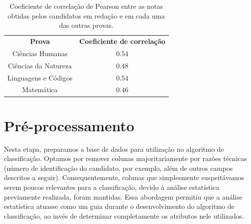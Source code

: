 \documentclass[12pt]{article}
\newcommand{\reffig}[1]{Fig.~\ref{fig:#1}}
\begin{document}
\begin{table}[H]
\centering\begin{tabular}{ c c }
  \textbf{Prova}       & \textbf{Coeficiente de correlação} \\
  Ciências Humanas     & 0.54 \\
  Ciências da Natureza & 0.48 \\
  Linguagens e Códigos & 0.54 \\
  Matemática           & 0.46 \\
\end{tabular}
\caption{Coeficiente de correlação de Pearson entre as notas obtidas pelos candidatos em redação e em cada uma das outras provas.}
\label{tab:coeficiente-pearson-por-prova}
\end{table}




\section{Pré-processamento}
\label{sec:pre-processamento}
Nesta etapa, preparamos a base de dados para utilização no algoritmo de classificação.
Optamos por remover colunas majoritariamente por razões técnicas (número de identificação do candidato, por exemplo, além de outros campos descritos a seguir). Consequentemente, colunas que simplesmente suspeitávamos serem poucos relevantes para a classificação, devido à análise estatística previamente realizada, foram mantidas.
Essa abordagem permitiu que a análise estatística atuasse como um guia durante o desenvolvimento do algoritmo de classificação, ao invés de determinar completamente os atributos nele utilizados.
\end{document}
